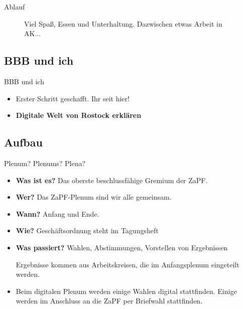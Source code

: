 \documentclass[compress,]{beamer}
\begin{document}
\begin{frame}{Ablauf}
\begin{figure}
\begin{minipage}[b]{.45\linewidth}
   \end{minipage}
   \caption{Viel Spaß, Essen und Unterhaltung. Dazwischen etwas Arbeit in AK...}
\end{figure}

\end{frame}


\subsection{BBB und ich}
\begin{frame}{BBB und ich}
  \begin{itemize}[<+->]
  \item Erster Schritt geschafft. Ihr seit hier!
  \item \textbf{Digitale Welt von Rostock erklären}
  \end{itemize}

\end{frame}


\subsection{Aufbau}

\begin{frame}{Plenum? Plenums? Plena?}

  \begin{itemize}[<+->]
  \item \textbf{Was ist es?} Das oberste beschlussfähige Gremium der ZaPF.
  \item \textbf{Wer?} Das ZaPF-Plenum sind wir alle gemeinsam.
  \item \textbf{Wann?} Anfang und Ende.
  \item \textbf{Wie?} Geschäftsordnung steht im Tagungsheft
  \item \textbf{Was passiert?} Wahlen, Abstimmungen, Vorstellen von Ergebnissen

    Ergebnisse kommen aus Arbeitskreisen, die im Anfangsplenum eingeteilt werden.
  \item Beim digitalen Plenum werden einige Wahlen digital stattfinden. Einige werden im Anschluss an die ZaPF per Briefwahl stattfinden.  
  \end{itemize}


\end{frame}
\end{document}
